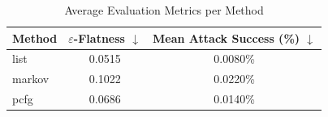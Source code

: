 \begin{table}[h]
\centering
\caption{Average Evaluation Metrics per Method}
\label{tab:honeyword-metrics}
\begin{tabular}{lcc}
\hline
Method & $\varepsilon$-Flatness $\downarrow$ & Mean Attack Success (\%) $\downarrow$ \\
\hline
  list & 0.0515 & 0.0080\% \\
  markov & 0.1022 & 0.0220\% \\
  pcfg & 0.0686 & 0.0140\% \\
\hline
\end{tabular}
\end{table}